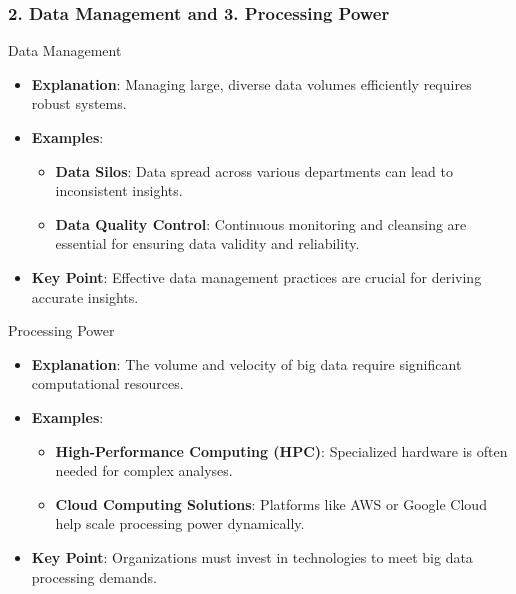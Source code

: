 \documentclass[aspectratio=169]{beamer}
\begin{document}
\begin{frame}[fragile]
  \frametitle{2. Data Management and 3. Processing Power}
  \begin{block}{Data Management}
    \begin{itemize}
      \item \textbf{Explanation}: Managing large, diverse data volumes efficiently requires robust systems.
      \item \textbf{Examples}:
      \begin{itemize}
        \item \textbf{Data Silos}: Data spread across various departments can lead to inconsistent insights.
        \item \textbf{Data Quality Control}: Continuous monitoring and cleansing are essential for ensuring data validity and reliability.
      \end{itemize}
      \item \textbf{Key Point}: Effective data management practices are crucial for deriving accurate insights.
    \end{itemize}
  \end{block}

  \begin{block}{Processing Power}
    \begin{itemize}
      \item \textbf{Explanation}: The volume and velocity of big data require significant computational resources.
      \item \textbf{Examples}:
      \begin{itemize}
        \item \textbf{High-Performance Computing (HPC)}: Specialized hardware is often needed for complex analyses.
        \item \textbf{Cloud Computing Solutions}: Platforms like AWS or Google Cloud help scale processing power dynamically.
      \end{itemize}
      \item \textbf{Key Point}: Organizations must invest in technologies to meet big data processing demands.
    \end{itemize}
  \end{block}
\end{frame}
\end{document}
